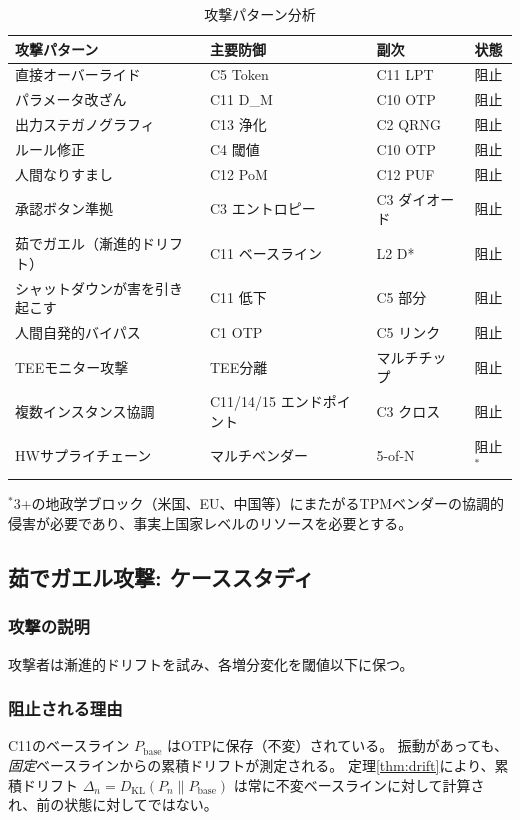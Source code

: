 \documentclass[11pt,a4paper]{article}
\newcommand{\DKL}{D_{\text{KL}}}
\begin{document}
\begin{table}[htbp]
\centering
\caption{攻撃パターン分析}
\label{tab:attacks}
\begin{tabular}{@{}p{3.5cm}p{2.5cm}p{2cm}l@{}}
\toprule
攻撃パターン & 主要防御 & 副次 & 状態 \\
\midrule
直接オーバーライド & C5 Token & C11 LPT & 阻止 \\
パラメータ改ざん & C11 D\_M & C10 OTP & 阻止 \\
出力ステガノグラフィ & C13 浄化 & C2 QRNG & 阻止 \\
ルール修正 & C4 閾値 & C10 OTP & 阻止 \\
人間なりすまし & C12 PoM & C12 PUF & 阻止 \\
承認ボタン準拠 & C3 エントロピー & C3 ダイオード & 阻止 \\
茹でガエル（漸進的ドリフト） & C11 ベースライン & L2 D* & 阻止 \\
シャットダウンが害を引き起こす & C11 低下 & C5 部分 & 阻止 \\
人間自発的バイパス & C1 OTP & C5 リンク & 阻止 \\
TEEモニター攻撃 & TEE分離 & マルチチップ & 阻止 \\
複数インスタンス協調 & C11/14/15 エンドポイント & C3 クロス & 阻止 \\
HWサプライチェーン & マルチベンダー & 5-of-N & 阻止$^*$ \\
\bottomrule
\end{tabular}

\smallskip
\noindent $^*$3+の地政学ブロック（米国、EU、中国等）にまたがるTPMベンダーの協調的侵害が必要であり、事実上国家レベルのリソースを必要とする。
\end{table}

\subsection{茹でガエル攻撃: ケーススタディ}

\subsubsection{攻撃の説明}

攻撃者は漸進的ドリフトを試み、各増分変化を閾値以下に保つ。

\subsubsection{阻止される理由}

C11のベースライン $P_{\text{base}}$ はOTPに保存（不変）されている。
振動があっても、\emph{固定}ベースラインからの累積ドリフトが測定される。
定理\ref{thm:drift}により、累積ドリフト $\Delta_n = \DKL(P_n \| P_{\text{base}})$ は常に不変ベースラインに対して計算され、前の状態に対してではない。
\end{document}

